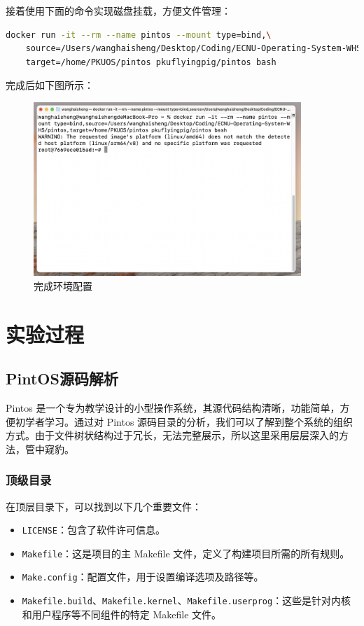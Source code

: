 \documentclass{article}
\begin{document}
接着使用下面的命令实现磁盘挂载，方便文件管理：

\begin{lstlisting}[language=Bash, title=启动Docker容器并挂载文件]
	docker run -it --rm --name pintos --mount type=bind,\
	source=/Users/wanghaisheng/Desktop/Coding/ECNU-Operating-System-WHS/pintos,\
	target=/home/PKUOS/pintos pkuflyingpig/pintos bash
\end{lstlisting}

完成后如下图所示：

\begin{figure}[H]
	\centering
	\includegraphics[width=0.9\textwidth]{img/run_docker.png}
	\caption{完成环境配置}
\end{figure}

\normalsize

\section{实验过程}

\subsection{PintOS源码解析}

Pintos 是一个专为教学设计的小型操作系统，其源代码结构清晰，功能简单，方便初学者学习。通过对 Pintos 源码目录的分析，我们可以了解到整个系统的组织方式。由于文件树状结构过于冗长，无法完整展示，所以这里采用层层深入的方法，管中窥豹。

\subsubsection{顶级目录}
在顶层目录下，可以找到以下几个重要文件：
\begin{itemize}
	\item \texttt{LICENSE}：包含了软件许可信息。
	\item \texttt{Makefile}：这是项目的主 Makefile 文件，定义了构建项目所需的所有规则。
	\item \texttt{Make.config}：配置文件，用于设置编译选项及路径等。
	\item \texttt{Makefile.build}、\texttt{Makefile.kernel}、\texttt{Makefile.userprog}：这些是针对内核和用户程序等不同组件的特定 Makefile 文件。
\end{itemize}
\end{document}
